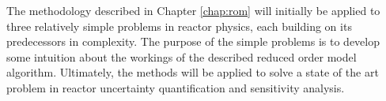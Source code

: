 The methodology described in Chapter \ref{chap:rom} will initially be applied to three relatively simple problems in reactor physics, each building on its predecessors in complexity. The purpose of the simple problems is to develop some intuition about the workings of the described reduced order model algorithm. Ultimately, the methods will be applied to solve a state of the art problem in reactor uncertainty quantification and sensitivity analysis.







